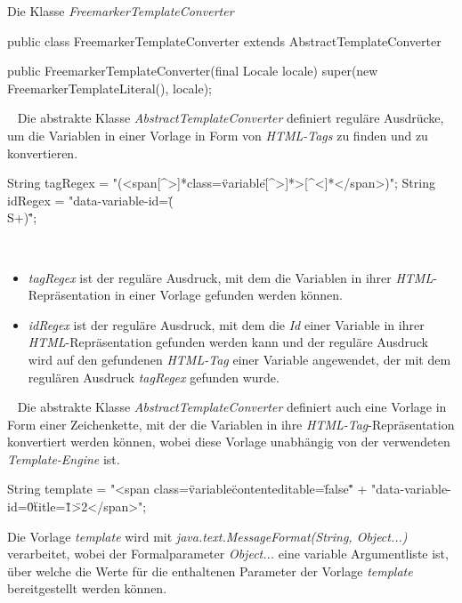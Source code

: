 \begin{program}
\caption{Die Klasse \emph{FreemarkerTemplateConverter}}
\label{prog:freemarkerTemplateConverter}
\begin{JavaCode}
public class FreemarkerTemplateConverter 
                          extends AbstractTemplateConverter {

    public FreemarkerTemplateConverter(final Locale locale) {
        super(new FreemarkerTemplateLiteral(), locale);
    }
}
\end{JavaCode}
\end{program}
\ \newline
Die abstrakte Klasse \emph{AbstractTemplateConverter} definiert reguläre Ausdrücke, um die Variablen in einer Vorlage in Form von \emph{HTML-Tags} zu finden und zu konvertieren.
\begin{JavaCode}[numbers=none]
String tagRegex = "(<span[^>]*class=\"variable\"[^>]*>[^<]*</span>)";
String idRegex  = "data-variable-id=\"(\\S+)\"";
\end{JavaCode}
\ \begin{itemize}
	\item\emph{tagRegex}
	\newline
	ist der reguläre Ausdruck, mit dem die Variablen in ihrer \emph{HTML}-Repräsentation in einer Vorlage gefunden werden können.
	\item\emph{idRegex}
	\newline
	ist der reguläre Ausdruck, mit dem die \emph{Id} einer Variable in ihrer \emph{HTML}-Repräsentation gefunden werden kann und der reguläre Ausdruck wird auf den gefundenen \emph{HTML-Tag} einer Variable angewendet, der mit dem regulären Ausdruck \emph{tagRegex} gefunden wurde.
\end{itemize}
\ \newline
Die abstrakte Klasse \emph{AbstractTemplateConverter} definiert auch eine Vorlage in Form einer Zeichenkette, mit der die Variablen in ihre \emph{HTML-Tag}-Repräsentation konvertiert werden können, wobei diese Vorlage unabhängig von der verwendeten \emph{Template-Engine} ist.
\begin{JavaCode}
String template = "<span class=\"variable\" contenteditable=\"false\" "
                + "data-variable-id=\"{0}\" title=\"{1}\">{2}</span>";
\end{JavaCode}
Die Vorlage \emph{template} wird mit \emph{java.text.MessageFormat(String, Object...)} verarbeitet, wobei der Formalparameter \emph{Object...} eine variable Argumentliste ist, über welche die Werte für die enthaltenen Parameter der Vorlage \emph{template} bereitgestellt werden können. 
\newpage

